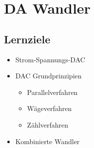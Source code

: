 \section{DA Wandler}
\subsection{Lernziele}
\begin{itemize}
  \item Strom-Spannungs-DAC
  \item DAC Grundprinzipien
  \begin{itemize}
    \item Parallelverfahren  
    \item Wägeverfahren
    \item Zählverfahren
   \end{itemize}
  \item Kombinierte Wandler
\end{itemize}

